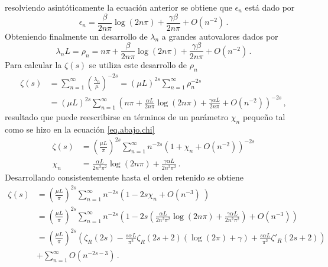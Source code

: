 resolviendo asintóticamente la ecuación anterior se obtiene que $\epsilon _n$ está dado por 
\begin{equation}\label{anterior}
    \epsilon _n =  \frac{\beta }{2 n \pi} \log (2 n \pi) +
                \frac{\gamma \beta}{2 n \pi} +
                O\left(  n^{-2} \right)
                	\, .
\end{equation}
Obteniendo finalmente un desarrollo de  $\lambda _n$ a grandes autovalores dados por
\begin{equation}
	\lambda _n L= 
	\rho _n = 
	n \pi
	+ \frac{\beta }{2 n \pi} \log (2 n \pi)
	+ \frac{\gamma \beta}{2 n \pi}
	+ O ( n^{-2} )
\, .
\end{equation}
Para calcular la $\zeta (s)$ se utiliza este desarrollo de $\rho _n$
\begin{equation*}
\begin{aligned}
    \zeta (s) &= \sum _{n=1} ^{\infty} \left( \frac{\lambda _n}{\mu} \right) ^{-2 s}  
    = ( \mu L) ^{2 s} \sum _{n=1} ^{\infty}  \rho _n  ^{-2 s}  \\
    & =    ( \mu L) ^{2 s} \sum _{n=1} ^{\infty} 
    \left( 
    n \pi + \frac{\alpha L }{2 n \pi} \log (2 n \pi) + \frac{\gamma \alpha L}{2 n \pi} +
    O \left( n^{-2} \right)
    \right) ^{-2s}
    	\, ,
\end{aligned}
\end{equation*}
resultado que puede reescribirse en términos de un parámetro $\chi _n$ pequeño tal como se hizo en la ecuación \eqref{eq.abajo.chi}
\begin{equation}
\begin{aligned}
    \zeta  (s) &= \left( \frac{\mu L }{\pi} \right)  ^{2 s} 
    \sum _{n=1} ^{\infty} n ^{- 2  s} 
    \left(
    	1 + \chi _n  + O( n^{-2} )
    	\right) ^{-2 s} \\[5pt]
		 \chi _n &= 
    	\frac{\alpha L  }{2 n^2 \pi ^2} \log (2 n \pi) + 
    	\frac{\gamma \alpha L}{2 n^2 \pi ^2 }  
    			\, .
\end{aligned}
\end{equation}
Desarrollando consistentemente hasta el orden retenido se obtiene
\begin{align}\label{eq.zeta.c}
    \zeta  (s) &= \left( \frac{\mu L}{\pi} \right) ^{2 s}
    \sum _{n=1} ^{\infty} 
    n ^{-2s}
    \left(
    1 - 2 s \chi _n + O \left( n ^{-3} \right) \
    \right)   \nonumber \\[5pt]
     &= \left( \frac{\mu L }{\pi} \right) ^{2 s}
    \sum _{n=1} ^{\infty} n ^{-2 s} 
    \left(
    1 - 2s \left(
    \frac{\alpha L }{2 n ^2 \pi ^2} \log ( 2  n \pi) + 
    \frac{\gamma \alpha L }{2 n ^2 \pi ^2} 
	\right) +
    O \left( n ^{-3}   \right)
    \right) \nonumber \\[5pt]
    &=   \left( \frac{\mu L }{ \pi } \right) ^{2 s}  
    \left( \zeta _R (2 s) -
	\frac{ s \alpha L}{ \pi ^2} \zeta _R (2s+2)
	\left(
	    \log (2  \pi ) + \gamma
	\right) + 
    \frac{s \alpha L}{\pi ^2}
	\zeta ' _R(2s+2) \right) \nonumber \\[5pt]
	& + \sum _{n=1} ^{\infty} O \left( n ^{-2s-3} \right) \, .
\end{align}    
